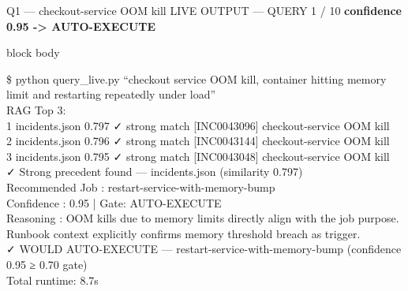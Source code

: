 \documentclass[aspectratio=169,10pt]{beamer}
\newcommand{\slidecat}[1]{{\color{cdim}\ttfamily\scriptsize\MakeUppercase{#1}}}
\newenvironment{terminal}{%
  \begin{beamercolorbox}[sep=6pt,rounded=true,shadow=false]{block body}%
  \ttfamily\tiny\color{cterm}%
}{%
  \end{beamercolorbox}%
}
\begin{document}

\begin{frame}{Q1 — checkout-service OOM kill}
  \slidecat{Live Output — Query 1 / 10}
  {\color{cteal}\ttfamily\small\bfseries confidence 0.95 -> AUTO-EXECUTE}
  \vspace{0.15cm}
  \begin{terminal}
    \$ python query\_live.py ``checkout service OOM kill, container hitting memory limit and restarting repeatedly under load''\\
    \vspace{0.25em}
    RAG Top 3:\\
    \hspace*{0.4cm}1  incidents.json  0.797 ✓ strong match  [INC0043096] checkout-service OOM kill\\
    \hspace*{0.4cm}2  incidents.json  0.796 ✓ strong match  [INC0043144] checkout-service OOM kill\\
    \hspace*{0.4cm}3  incidents.json  0.795 ✓ strong match  [INC0043048] checkout-service OOM kill\\
    \vspace{0.25em}
    ✓ Strong precedent found — incidents.json (similarity 0.797)\\
    \vspace{0.25em}
    Recommended Job : {\color{cauto}restart-service-with-memory-bump}\\
    Confidence      : {\color{cauto}0.95}  |  Gate: {\color{cauto}AUTO-EXECUTE}\\
    Reasoning       : OOM kills due to memory limits directly align with the job purpose.\\
    \hspace*{0.4cm}Runbook context explicitly confirms memory threshold breach as trigger.\\
    \vspace{0.25em}
    {\color{cauto}✓ WOULD AUTO-EXECUTE  —  restart-service-with-memory-bump  (confidence 0.95 ≥ 0.70 gate)}\\
    Total runtime: 8.7s
  \end{terminal}
\end{frame}
\end{document}
